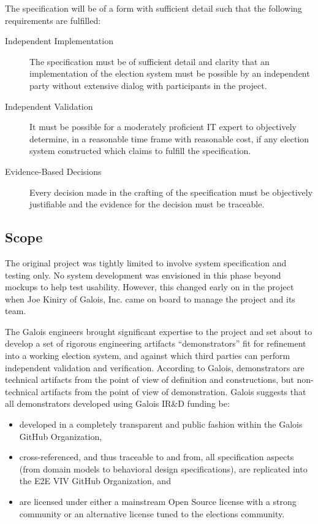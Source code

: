 The specification will be of a form with sufficient detail such that
the following requirements are fulfilled:
\begin{description}
\item[Independent Implementation] The specification must be of
  sufficient detail and clarity that an implementation of the election
  system must be possible by an independent party without extensive
  dialog with participants in the project.
\item[Independent Validation] It must be possible for a moderately
  proficient IT expert to objectively determine, in a reasonable time
  frame with reasonable cost, if any election system constructed which
  claims to fulfill the specification.
\item[Evidence-Based Decisions] Every decision made in the crafting of
  the specification must be objectively justifiable and the evidence
  for the decision must be traceable. 
\end{description}

\subsection{Scope}

The original project was tightly limited to involve system
specification and testing only. No system development was envisioned
in this phase beyond mockups to help test usability. However, this
changed early on in the project when Joe Kiniry of Galois, Inc. came
on board to manage the project and its team. 

The Galois engineers brought significant expertise to the project and
set about to develop a set of rigorous engineering artifacts
``demonstrators'' fit for refinement into a working election system, and
against which third parties can perform independent validation and
verification. According to Galois, demonstrators are technical
artifacts from the point of view of definition and constructions, but
non-technical artifacts from the point of view of
demonstration. Galois suggests that all demonstrators developed using
Galois IR\&D funding be: 
\begin{itemize}
\item developed in a completely transparent and public fashion within
  the Galois GitHub Organization, 
\item cross-referenced, and thus traceable to and from, all
  specification aspects (from domain models to behavioral design
  specifications), are replicated into the E2E VIV GitHub
  Organization, and
\item are licensed under either a mainstream Open Source license with
  a strong community or an alternative license tuned to the elections
  community.
\end{itemize}

